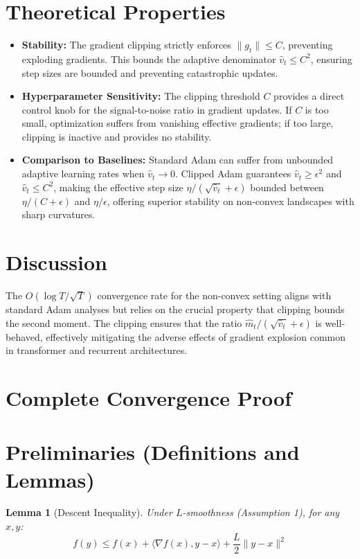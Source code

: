 \documentclass{article}
\newtheorem{lemma}[theorem]{Lemma}
\begin{document}
\section*{Theoretical Properties}
\begin{itemize}
\item \textbf{Stability:} The gradient clipping strictly enforces $\|g_t\| \leq C$, preventing exploding gradients. This bounds the adaptive denominator $\hat{v}_t \leq C^2$, ensuring step sizes are bounded and preventing catastrophic updates.
\item \textbf{Hyperparameter Sensitivity:} The clipping threshold $C$ provides a direct control knob for the signal-to-noise ratio in gradient updates. If $C$ is too small, optimization suffers from vanishing effective gradients; if too large, clipping is inactive and provides no stability.
\item \textbf{Comparison to Baselines:} Standard Adam can suffer from unbounded adaptive learning rates when $\hat{v}_t \to 0$. Clipped Adam guarantees $\hat{v}_t \geq \epsilon^2$ and $\hat{v}_t \leq C^2$, making the effective step size $\eta / (\sqrt{\hat{v}_t} + \epsilon)$ bounded between $\eta / (C + \epsilon)$ and $\eta / \epsilon$, offering superior stability on non-convex landscapes with sharp curvatures.
\end{itemize}

\section*{Discussion}
The $O(\log T / \sqrt{T})$ convergence rate for the non-convex setting aligns with standard Adam analyses but relies on the crucial property that clipping bounds the second moment. The clipping ensures that the ratio $\hat{m}_t / (\sqrt{\hat{v}_t} + \epsilon)$ is well-behaved, effectively mitigating the adverse effects of gradient explosion common in transformer and recurrent architectures.

\section*{Complete Convergence Proof}
\section*{Preliminaries (Definitions and Lemmas)}
\begin{lemma}[Descent Inequality]
Under $L$-smoothness (Assumption 1), for any $x, y$:
$$ f(y) \leq f(x) + \langle \nabla f(x), y - x \rangle + \frac{L}{2} \|y - x\|^2 $$
\end{lemma}
\end{document}
